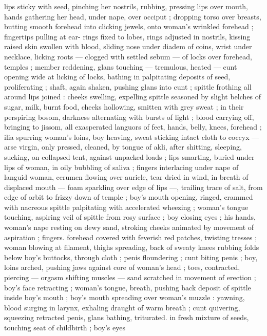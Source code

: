 {lips sticky with seed, pinching her nostrils, rubbing, pressing lips 
over mouth, hands gathering her head, under nape, over occiput ; 
dropping torso over breasts, butting smooth forehead into clicking 
jewels, onto woman's wrinkled forehead ; fingertips pulling at ear- 
rings fixed to lobes, rings adjusted in nostrils, kissing raised skin 
swollen with blood, sliding nose under diadem of coins, wrist under 
necklace, licking roots --- clogged with settled sebum --- of locks 
over forehead, temples ; member reddening, glans touching --- 
tremulous, heated --- cunt opening wide at licking of locks, bathing 
in palpitating deposits of seed, proliferating ; shaft, again shaken, 
pushing glans into cunt ; spittle frothing all around lips joined : 
cheeks swelling, expelling spittle seasoned by slight belches of 
sugar, milk, burnt food, cheeks hollowing, smitten with grey sweat ; 
in their perspiring bosom, darkness alternating with bursts of light ; 
blood carrying off, bringing to jissom, all exasperated languors of 
feet, hands, belly, knees, forehead ; ilia spurring woman's loins, boy 
heaving, sweat sticking intact cloth to coccyx --- arse virgin, only 
pressed, cleaned, by tongue of akli, after shitting, sleeping, sucking, 
on collapsed tent, against unpacked loads ; lips smarting, buried 
under lips of woman, in oily bubbling of saliva ; fingers interlacing 
under nape of languid woman, cerumen flowing over auricle, tear 
dried in wind, in breath of displaced mouth --- foam sparkling over 
edge of lips ---, trailing trace of salt, from edge of orbit to frizzy 
down of temple ; boy's mouth opening, ringed, crammed with 
nacreous spittle palpitating with accelerated wheezing ; woman's 
tongue touching, aspiring veil of spittle from rosy surface ; boy 
closing eyes ; his hands, woman's nape resting on dewy sand, 
stroking cheeks animated by movement of aspiration ; fingers. 
forehead covered with feverish red patches, twisting tresses ; woman 
blowing at filament, thighs spreading, back of sweaty knees rubbing 
folds below boy's buttocks, through cloth ; penis floundering ; cunt 
biting penis ; boy, loins arched, pushing jaws against core of 
woman's head ; toes, contracted, piercing --- orgasm shifting 
muscles --- sand scratched in movement of erection ; boy's face 
retracting ; woman's tongue, breath, pushing back deposit of spittle 
inside boy's mouth ; boy's mouth spreading over woman's muzzle : 
yawning, blood surging in larynx, exhaling draught of warm breath ; 
cunt quivering, squeezing retracted penis, glans bathing, triturated. 
in fresh mixture of seeds, touching seat of childbirth ; boy's eyes 
}
